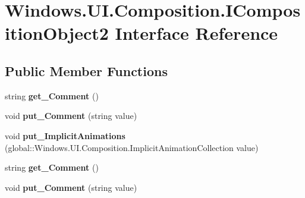 \hypertarget{interface_windows_1_1_u_i_1_1_composition_1_1_i_composition_object2}{}\section{Windows.\+U\+I.\+Composition.\+I\+Composition\+Object2 Interface Reference}
\label{interface_windows_1_1_u_i_1_1_composition_1_1_i_composition_object2}
\subsection*{Public Member Functions}
\begin{DoxyCompactItemize}
\item 
\mbox{\label{interface_windows_1_1_u_i_1_1_composition_1_1_i_composition_object2_af58ddc1f26fe2c8ff74092881eccb458}} 
string {\bfseries get\+\_\+\+Comment} ()
\item 
\mbox{\label{interface_windows_1_1_u_i_1_1_composition_1_1_i_composition_object2_a724426452fb19b2b146681bf0b264ac1}} 
void {\bfseries put\+\_\+\+Comment} (string value)
\item 
\mbox{\label{interface_windows_1_1_u_i_1_1_composition_1_1_i_composition_object2_a968d62a160aef72621974d9f819c661b}} 
void {\bfseries put\+\_\+\+Implicit\+Animations} (global\+::\+Windows.\+U\+I.\+Composition.\+Implicit\+Animation\+Collection value)
\item 
\mbox{\label{interface_windows_1_1_u_i_1_1_composition_1_1_i_composition_object2_af58ddc1f26fe2c8ff74092881eccb458}} 
string {\bfseries get\+\_\+\+Comment} ()
\item 
\mbox{\label{interface_windows_1_1_u_i_1_1_composition_1_1_i_composition_object2_a724426452fb19b2b146681bf0b264ac1}} 
void {\bfseries put\+\_\+\+Comment} (string value)
\item 
\mbox{\label{interface_windows_1_1_u_i_1_1_composition_1_1_i_composition_object2_a968d62a160aef72621974d9f819c661b}} 

\end{DoxyCompactItemize}

